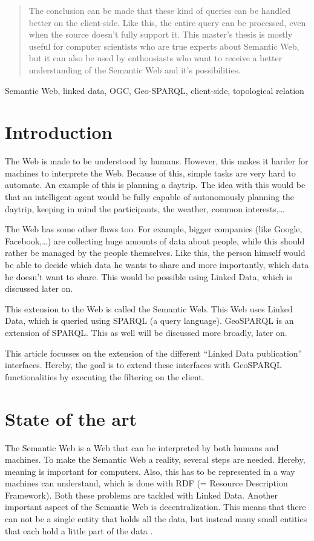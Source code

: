 \documentclass[twocolumn]{phdsymp} %
\begin{document}
\begin{abstract}
    The conclusion can be made that these kind of queries can be handled better on the client-side. Like this, the entire query can be processed, even when the source doesn't fully support it. This master's thesis is mostly useful for computer scientists who are true experts about Semantic Web, but it can also be used by enthousiasts who want to receive a better understanding of the Semantic Web and it's possibilities.
\end{abstract}

\begin{keywords}
    Semantic Web, linked data, OGC, Geo-SPARQL, client-side, topological relation
\end{keywords}

\section{Introduction}
The Web is made to be understood by humans. However, this makes it harder for machines to interprete the Web. Because of this, simple tasks are very hard to automate. An example of this is planning a daytrip. The idea with this would be that an intelligent agent would be fully capable of autonomously planning the daytrip, keeping in mind the participants, the weather, common interests,\dots

The Web has some other flaws too. For example, bigger companies (like Google, Facebook,\dots) are collecting huge amounts of data about people, while this should rather be managed by the people themselves. Like this, the person himself would be able to decide which data he wants to share and more importantly, which data he doesn't want to share. This would be possible using Linked Data, which is discussed later on.

This extension to the Web is called the Semantic Web. This Web uses Linked Data, which is queried using SPARQL (a query language). GeoSPARQL is an extension of SPARQL. This as well will be discussed more broadly, later on.

This article focusses on the extension of the different ``Linked Data publication'' interfaces. Hereby, the goal is to extend these interfaces with GeoSPARQL functionalities by executing the filtering on the client.

\section{State of the art}
The Semantic Web is a Web that can be interpreted by both humans and machines. To make the Semantic Web a reality, several steps are needed. Hereby, meaning is important for computers. Also, this has to be represented in a way machines can understand, which is done with RDF (= Resource Description Framework). Both these problems are tackled with Linked Data. Another important aspect of the Semantic Web is decentralization. This means that there can not be a single entity that holds all the data, but instead many small entities that each hold a little part of the data \cite{berners2001semantic}. 
\end{document}
